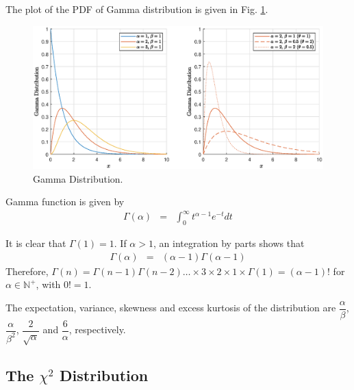 The plot of the PDF of Gamma distribution is given in Fig. \ref{fig:gamma_pdf}.
\begin{figure}
	\centering
	\includegraphics[width=350pt]{chapters/ch-commonly-seen-distributions/figs/gamma_pdf.eps}
	\caption{Gamma Distribution.} \label{fig:gamma_pdf}
\end{figure}

\begin{shortbox}

Gamma function is given by
\begin{eqnarray}
  \Gamma(\alpha) &=& \int_{0}^{\infty}t^{\alpha-1}e^{-t}dt \nonumber
\end{eqnarray}

It is clear that $\Gamma(1)=1$. If $\alpha > 1$, an integration by parts shows that
\begin{eqnarray}
  \Gamma(\alpha) &=& (\alpha-1)\Gamma(\alpha-1) \nonumber
\end{eqnarray}
Therefore, $\Gamma(n)=\Gamma(n-1)\Gamma(n-2)\ldots \times 3 \times 2 \times 1 \times \Gamma(1) = (\alpha-1)!$ for $\alpha \in \mathbb{N}^+$, with $0!=1$.

\end{shortbox}

The expectation, variance, skewness and excess kurtosis of the distribution are $\dfrac{\alpha}{\beta}$, $\dfrac{\alpha}{\beta^2}$, $\dfrac{2}{\sqrt{\alpha}}$ and $\dfrac{6}{\alpha}$, respectively.

\subsection{The $\chi^2$ Distribution}

